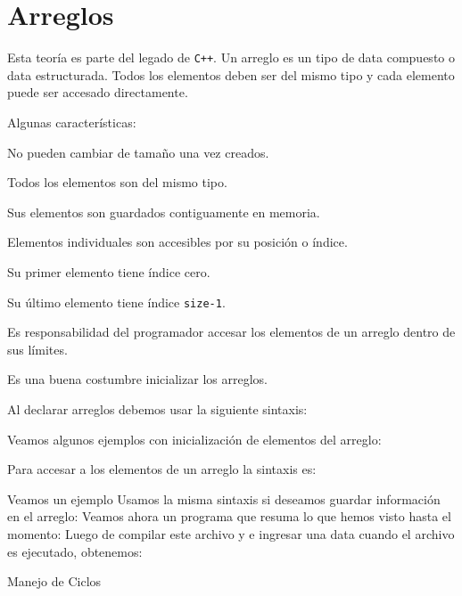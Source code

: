 \chapter{Arreglos}

Esta teoría es parte del legado de \texttt{C++}.
Un arreglo es un tipo de data compuesto o data estructurada.
Todos los elementos deben ser del mismo tipo y cada elemento puede ser accesado directamente.

Algunas características:

\begin{compactitem}
	\item No pueden cambiar de tamaño una vez creados.
	\item Todos los elementos son del mismo tipo.
	\item Sus elementos son guardados contiguamente en memoria.
	\item Elementos individuales son accesibles por su posición o índice.
	\item Su primer elemento tiene índice cero.
	\item Su último elemento tiene índice \texttt{size-1}.
	\item Es responsabilidad del programador accesar los elementos de un arreglo dentro de sus límites.
	\item Es una buena costumbre inicializar los arreglos.
\end{compactitem}

Al declarar arreglos debemos usar la siguiente sintaxis:
\begin{center}
\end{center}

Veamos algunos ejemplos con inicialización de elementos del arreglo:

Para accesar a los elementos de un arreglo la sintaxis es:
\begin{center}
\end{center}
Veamos un ejemplo
Usamos la misma sintaxis si deseamos guardar información en el arreglo:
Veamos ahora un programa que resuma lo que hemos visto hasta el momento:
Luego de compilar este archivo y e ingresar una data cuando el archivo es ejecutado, obtenemos:
\immediate{}

Manejo de Ciclos
